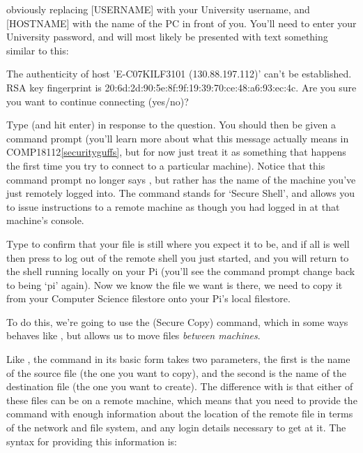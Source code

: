 obviously replacing [USERNAME] with your University username, and [HOSTNAME] with the name of the PC in front of you. You'll need to enter your University password, and will most likely be presented with text something similar to this:

\begin{ttoutenv}
The authenticity of host 'E-C07KILF3101 (130.88.197.112)' can't be established.
RSA key fingerprint is 20:6d:2d:90:5e:8f:9f:19:39:70:ce:48:a6:93:ec:4c.
Are you sure you want to continue connecting (yes/no)? 
\end{ttoutenv}

Type  (and hit enter) in response to the question. You should then be given a command prompt (you'll learn more about what this message actually means in COMP18112\ref{securityguffs}, but for now just treat it as something that happens the first time you try to connect to a particular machine). Notice that this command prompt no longer says , but rather has the name of the machine you've just remotely logged into. The  command stands for `Secure Shell', and allows you to issue instructions to a remote machine as though you had logged in at that machine's console. 

Type  to confirm that your  file is still where you expect it to be, and if all is well then press  to log out of the remote shell you just started, and you will return to the shell running locally on your Pi (you'll see the command prompt change back to being `pi' again). Now we know the file we want is there, we need to copy it from your Computer Science filestore onto your Pi's local filestore.

To do this, we're going to use the  (Secure Copy) command, which in some ways behaves like , but allows us to move files \textit{between machines}. 

Like , the  command in its basic form takes two parameters, the first is the name of the source file (the one you want to copy), and the second is the name of the destination file (the one you want to create). The difference with  is that either of these files can be on a remote machine, which means that you need to provide the command with enough information about the location of the remote file in terms of the network and file system, and any login details necessary to get at it. The syntax for providing this information is:

